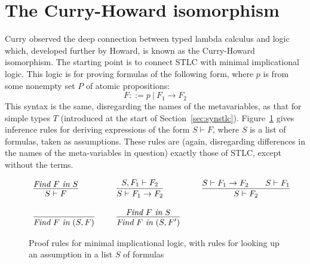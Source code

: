 \section{The Curry-Howard isomorphism}

Curry observed the deep connection between typed lambda calculus and
logic which, developed further by Howard, is known as the Curry-Howard
isomorphism.  The starting point is to connect STLC with minimal
implicational logic.  This logic is for proving formulas of the
following form, where $p$ is from some nonempty set $P$ of atomic
propositions:
\[
F ::= p\ |\ F_1 \to F_2
\]
\noindent This syntax is the same, disregarding the names of the
metavariables, as that for simple types $T$ (introduced at the start
of Section~\ref{sec:synstlc}).  Figure~\ref{fig:minimpl} gives
inference rules for deriving expressions of the form $S \vdash F$,
where $S$ is a list of formulas, taken as assumptions.  These rules
are (again, disregarding differences in the names of the
meta-variables in question) exactly those of STLC, except without
the terms.

\begin{figure}
\[
\begin{array}{lllll}
\infer{S \vdash F}{\textit{Find}\ F\ \textit{in}\ S}

&\ \ &

\infer{S \vdash F_1 \to F_2}{S , F_1 \vdash F_2}

&\ \ &

\infer{S \vdash F_2}{S \vdash F_1\to F_2 \qquad S \vdash F_1}

\\ \\

\infer{\textit{Find}\ F\ \textit{in}\ (S, F)}{\ }

&\ \ &

\infer{\textit{Find}\ F\ \textit{in}\ (S, F')}{\textit{Find}\ F\ \textit{in}\ S}

&\ \ &

\ 

\end{array}
\]
\caption{Proof rules for minimal implicational logic, with rules for looking up an assumption in a list $S$ of formulas}
\label{fig:minimpl}
\end{figure}

